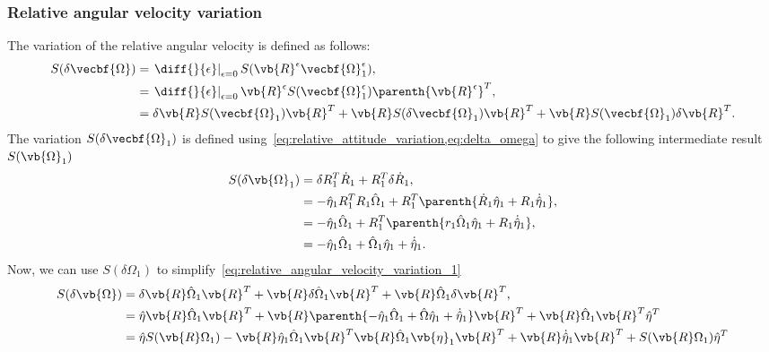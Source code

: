 \documentclass[11pt, reqno]{article}    %
\begin{document}
\subsubsection{Relative angular velocity variation}
The variation of the relative angular velocity is defined as follows:
\begin{align}\label{eq:relative_angular_velocity_variation_1}
    S(\delta \vecbf{\Omega}) &= \left. \diff{}{\epsilon} \right|_{\epsilon=0} S(\vb{R}^\epsilon  \vecbf{\Omega}^\epsilon_1) , \nonumber\\
    &= \left. \diff{}{\epsilon} \right|_{\epsilon=0} \vb{R}^\epsilon S(\vecbf{\Omega}^\epsilon_1)  \parenth{\vb{R}^\epsilon}^T, \nonumber\\
    &= \delta \vb{R} S(\vecbf{\Omega}_1) \vb{R}^T  + \vb{R} S(\delta \vecbf{\Omega}_1) \vb{R}^T + \vb{R} S(\vecbf{\Omega}_1) \delta \vb{R}^T .
\end{align}
The variation \( S(\delta \vecbf{\Omega}_1)\) is defined using~\cref{eq:relative_attitude_variation,eq:delta_omega} to give the following intermediate result \(S(\vb{\Omega}_1)\)
\begin{align*}
    S(\delta \vb{\Omega}_1) &= \delta R_1^T \dot{R}_1 + R_1^T \delta \dot{R}_1 , \\
                            &= -\hat{\eta}_1 R_1^T R_1 \hat{\Omega}_1 + R_1^T \parenth{\dot{R}_1 \hat{\eta}_1 + R_1 \dot{\hat{\eta}}_1} , \\
                            &= -\hat{\eta}_1 \hat{\Omega}_1 + R_1^T \parenth{r_1 \hat{\Omega}_1 \hat{\eta}_1 + R_1 \dot{\hat{\eta}}_1 } , \\
                            &= - \hat{\eta}_1 \hat{\Omega}_1 + \hat{\Omega}_1 \hat{\eta}_1 + \dot{\hat{\eta}}_1 .
\end{align*}
Now, we can use \(S(\delta \Omega_1) \) to simplify~\cref{eq:relative_angular_velocity_variation_1}
\begin{align}\label{eq:relative_angular_velocity_variation_2}
    S(\delta \vb{\Omega}) &= \delta \vb{R} \hat{\Omega}_1 \vb{R}^T + \vb{R} \hat{\delta \Omega_1} \vb{R}^T + \vb{R} \hat{\Omega}_1 \delta \vb{R}^T , \\
                          &= \hat{\eta} \vb{R} \hat{\Omega}_1 \vb{R}^T + \vb{R} \parenth{-\hat{\eta}_1 \hat{\Omega}_1 + \hat{\Omega} \hat{\eta}_1 + \dot{\hat{\eta}}_1} \vb{R}^T + \vb{R} \hat{\Omega}_1 \vb{R}^T \hat{\eta}^T \\
                          &= \hat{\eta} S(\vb{R} \Omega_1) - \vb{R} \hat{\eta}_1 \hat{\Omega}_1 \vb{R}^T \vb{R} \hat{\Omega}_1 \vb{\eta}_1 \vb{R}^T + \vb{R} \dot{\hat{\eta}}_1 \vb{R}^T + S(\vb{R}\Omega_1) \hat{\eta}^T
\end{align}
\end{document}
